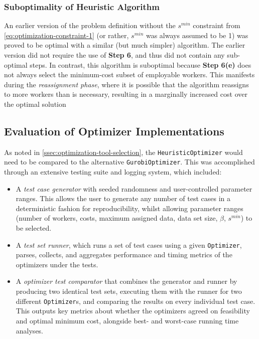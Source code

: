 \documentclass[../mthe-493-final-project.tex]{subfiles}
\begin{document}
    \subsubsection{Suboptimality of Heuristic Algorithm}
    \label{sssection:optimization-heuristic-suboptimality}
    
    An earlier version of the problem definition without the $s^{min}$ constraint from \eqref{eq:optimization-constraint-1} (or rather, $s^{min}$ was always assumed to be 1) was proved to be optimal with a similar (but much simpler) algorithm. The earlier version did not require the use of \textbf{Step 6}, and thus did not contain any sub-optimal steps. In contrast, this algorithm is suboptimal because \textbf{Step 6(e)} does not always select the minimum-cost subset of employable workers. This manifests during the \textit{reassignment phase}, where it is possible that the algorithm reassigns to more workers than is necessary, resulting in a marginally increased cost over the optimal solution
    
    \subsection{Evaluation of Optimizer Implementations}
    \label{ssection:optimization-optimizer-implementation-evaluation}
    
    As noted in \autoref{ssec:optimization-tool-selection}, the \texttt{HeuristicOptimizer} would need to be compared to the alternative \texttt{GurobiOptimizer}. This was accomplished through an extensive testing suite and logging system, which included:
    
    \begin{itemize}
        \item A \textit{test case generator} with seeded randomness and user-controlled parameter ranges. This allows the user to generate any number of test cases in a deterministic fashion for reproducibility, whilst allowing parameter ranges (number of workers, costs, maximum assigned data, data set size, $\beta$, $s^{min}$) to be selected.
        \item A \textit{test set runner}, which runs a set of test cases using a given \texttt{Optimizer}, parses, collects, and aggregates performance and timing metrics of the optimizers under the tests.
        \item A \textit{optimizer test comparator} that combines the generator and runner by producing two identical test sets, executing them with the runner for two different \texttt{Optimizer}s, and comparing the results on every individual test case. This outputs key metrics about whether the optimizers agreed on feasibility and optimal minimum cost, alongside best- and worst-case running time analyses.
    \end{itemize}
    
\end{document}
